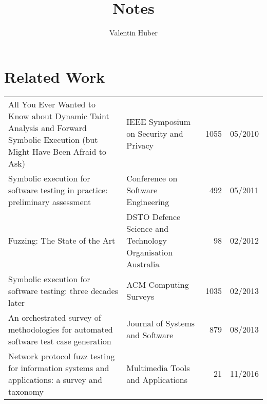\documentclass{article}
\title{Notes}
\author{Valentin Huber}
\begin{document}


\maketitle
\tableofcontents
\pagebreak

\section{Related Work}
\begin{longtable}{|P{0.44\textwidth}|P{0.32\textwidth}|r|r|}
  \hline
                                                                                                                               &                                              &  &  \\\hline
  \endhead
  All You Ever Wanted to Know about Dynamic Taint Analysis and Forward Symbolic Execution (but Might Have Been Afraid to Ask)\cite{AllYouEverWanted} & IEEE Symposium on Security and Privacy                     & 1055           & 05/2010       \\\hline
  Symbolic execution for software testing in practice: preliminary assessment\cite{PreliminaryAssessment}                                            & Conference on Software Engineering                         & 492            & 05/2011       \\\hline
  Fuzzing: The State of the Art\cite{FuzzingTheStateOfTheArt}                                                                                        & DSTO Defence Science and Technology Organisation Australia & 98             & 02/2012       \\\hline
  Symbolic execution for software testing: three decades later\cite{ReviewThreeDecades}                                                              & ACM Computing Surveys                                      & 1035           & 02/2013       \\\hline
  An orchestrated survey of methodologies for automated software test case generation\cite{Orchestrated}                                             & Journal of Systems and Software                            & 879            & 08/2013       \\\hline
  Network protocol fuzz testing for information systems and applications: a survey and taxonomy\cite{Network}                                        & Multimedia Tools and Applications                          & 21             & 11/2016       \\\hline

\end{longtable}
\end{document}
